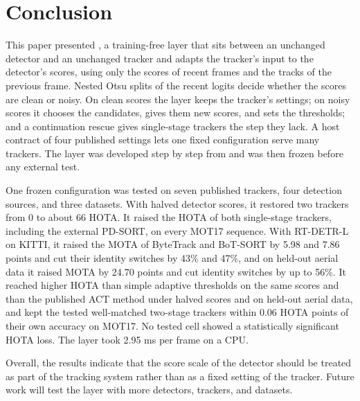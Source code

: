 \section{Conclusion}\label{sec:conclusion}

This paper presented \scl{}, a training-free layer that sits between an unchanged detector and an
unchanged tracker and adapts the tracker's input to the detector's scores, using only the scores of
recent frames and the tracks of the previous frame. Nested Otsu splits of the recent logits decide
whether the scores are clean or noisy. On clean scores the layer keeps the tracker's settings; on
noisy scores it chooses the candidates, gives them new scores, and sets the thresholds; and a
continuation rescue gives single-stage trackers the step they lack. A host contract of four
published settings lets one fixed configuration serve many trackers. The layer was developed step
by step from \aob{} and was then frozen before any external test.

One frozen configuration was tested on seven published trackers, four detection sources, and three
datasets. With halved detector scores, it restored two trackers from 0 to about 66 HOTA. It raised
the HOTA of both single-stage trackers, including the external PD-SORT, on every MOT17 sequence.
With RT-DETR-L on KITTI, it raised the MOTA of ByteTrack and BoT-SORT by 5.98 and 7.86 points and
cut their identity switches by 43\% and 47\%, and on held-out aerial data it raised MOTA by 24.70
points and cut identity switches by up to 56\%. It reached higher HOTA than simple adaptive
thresholds on the same scores and than the published ACT method under halved scores and on
held-out aerial data, and kept the tested well-matched two-stage trackers within 0.06 HOTA points
of their own accuracy on MOT17. No tested cell showed a statistically significant HOTA loss. The layer took 2.95 ms per frame on a CPU.

Overall, the results indicate that the score scale of the detector should be treated as part of
the tracking system rather than as a fixed setting of the tracker. Future work will test the layer with
more detectors, trackers, and datasets.
